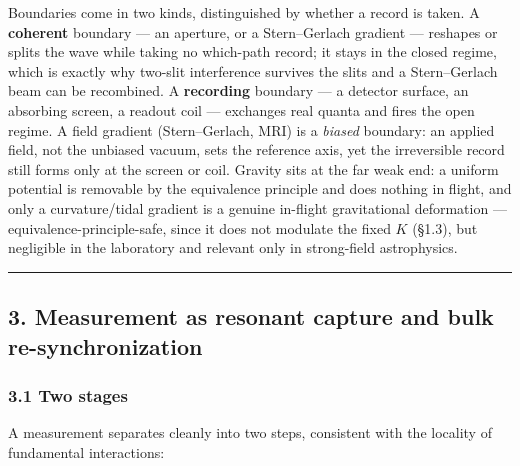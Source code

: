\documentclass[
]{article}
\begin{document}
Boundaries come in two kinds, distinguished by whether a record is
taken. A \textbf{coherent} boundary --- an aperture, or a Stern--Gerlach
gradient --- reshapes or splits the wave while taking no which-path
record; it stays in the closed regime, which is exactly why two-slit
interference survives the slits and a Stern--Gerlach beam can be
recombined. A \textbf{recording} boundary --- a detector surface, an
absorbing screen, a readout coil --- exchanges real quanta and fires the
open regime. A field gradient (Stern--Gerlach, MRI) is a \emph{biased}
boundary: an applied field, not the unbiased vacuum, sets the reference
axis, yet the irreversible record still forms only at the screen or
coil. Gravity sits at the far weak end: a uniform potential is removable
by the equivalence principle and does nothing in flight, and only a
curvature/tidal gradient is a genuine in-flight gravitational
deformation --- equivalence-principle-safe, since it does not modulate
the fixed \(K\) (§1.3), but negligible in the laboratory and relevant
only in strong-field astrophysics.

\begin{center}\rule{0.5\linewidth}{0.5pt}\end{center}

\subsection{3. Measurement as resonant capture and bulk
re-synchronization}\label{measurement-as-resonant-capture-and-bulk-re-synchronization}

\subsubsection{3.1 Two stages}\label{two-stages}

A measurement separates cleanly into two steps, consistent with the
locality of fundamental interactions:
\end{document}

